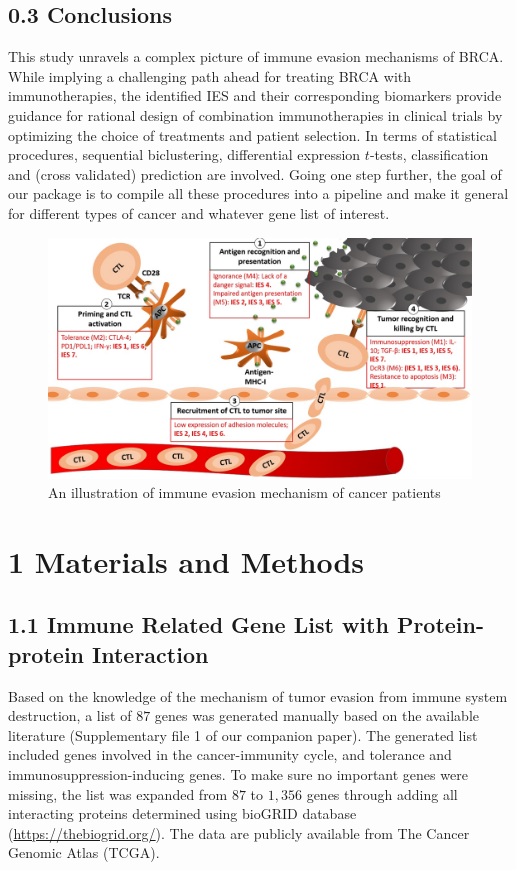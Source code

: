 \documentclass[a4paper, 11pt]{article}
\begin{document}
\subsection*{0.3 Conclusions}
This study unravels a complex picture of immune evasion mechanisms of BRCA. While implying a challenging path ahead for treating BRCA with immunotherapies, the identified IES and their corresponding biomarkers provide guidance for rational design of combination immunotherapies in clinical trials by optimizing the choice of treatments and patient selection. In terms of statistical procedures, sequential biclustering, differential expression $t$-tests, classification and (cross validated) prediction are involved. Going one step further, the goal of our package is to compile all these procedures into a pipeline and make it general for different types of cancer and whatever gene list of interest.
\begin{figure}[!tpb]
  \begin{center}
    \includegraphics[width=12 cm]{Figure1-final.jpg}
    \caption{An illustration of immune evasion mechanism of cancer patients}
    \label{fig:immu-mech}
  \end{center}
\end{figure}

\section*{1 Materials and Methods}
\subsection*{1.1 Immune Related Gene List with Protein-protein Interaction}
Based on the knowledge of the mechanism of tumor evasion from immune system destruction, a list of $87$ genes was generated manually based on the available literature (Supplementary file 1 of our companion paper). The generated list included genes involved in the cancer-immunity cycle, and tolerance and immunosuppression-inducing genes. To make sure no important genes were missing, the list was expanded from $87$ to $1,356$ genes through adding all interacting proteins determined using bioGRID database (\url{https://thebiogrid.org/}). The data are publicly available from The Cancer Genomic Atlas (TCGA).
\end{document}

